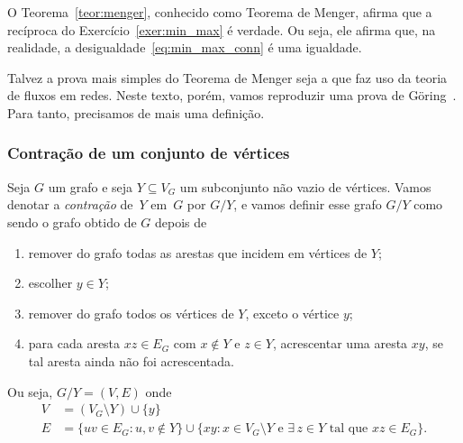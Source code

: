 \documentclass[12pt, a4paper]{article}
\theoremstyle{definition}
\begin{document}
O Teorema~\ref{teor:menger}, conhecido como Teorema de Menger, afirma que a recíproca do Exercício~\ref{exer:min_max} é verdade. Ou seja, ele afirma que, na realidade, a desigualdade~\eqref{eq:min_max_conn} é uma igualdade.

Talvez a prova mais simples do Teorema de Menger seja a que faz uso da teoria de fluxos em redes. Neste texto, porém, vamos reproduzir uma prova de Göring~\cite{Goring}. Para tanto, precisamos de mais uma definição. 

\subsubsection{Contração de um conjunto de vértices}

Seja $G$ um grafo e seja $Y \subseteq V_G$ um subconjunto não vazio de vértices. Vamos denotar a \emph{contração} de~$Y$ em~$G$ por $G/Y$, e vamos definir esse grafo $G/Y$ como sendo o grafo obtido de $G$ depois de
\begin{enumerate}
\item remover do grafo todas as arestas que incidem em vértices de $Y$;
\item \label{contr:step1} escolher $y \in Y$;
\item remover do grafo todos os vértices de $Y$, exceto o vértice $y$; 
\item para cada aresta $xz \in E_G$ com $x \not\in Y$ e $z \in Y$, acrescentar uma aresta $xy$, se tal aresta ainda não foi acrescentada.
\end{enumerate}
Ou seja, $G/Y = (V,E)$ onde
\begin{align*}
  V &= (V_G \setminus Y) \cup \{y\}\\
  E &= \{ uv \in E_G \colon u,v \not\in Y\} \cup \{xy \colon x \in V_G \setminus Y \text{ e } \exists\,z\in Y \text{ tal que }xz \in E_G\}.
\end{align*}
\end{document}

